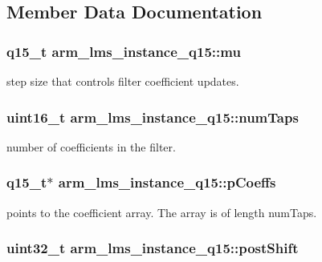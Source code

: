 \subsection{Member Data Documentation}
\hypertarget{structarm__lms__instance__q15_aae46129d7cfd7f1c162cc502ed0a9d49}{
\subsubsection[{mu}]{\setlength{\rightskip}{0pt plus 5cm}q15\-\_\-t arm\-\_\-lms\-\_\-instance\-\_\-q15\-::mu}}\label{structarm__lms__instance__q15_aae46129d7cfd7f1c162cc502ed0a9d49}
step size that controls filter coefficient updates. \hypertarget{structarm__lms__instance__q15_a0078e894f805af1b360369e619fb57b3}{
\subsubsection[{num\-Taps}]{\setlength{\rightskip}{0pt plus 5cm}uint16\-\_\-t arm\-\_\-lms\-\_\-instance\-\_\-q15\-::num\-Taps}}\label{structarm__lms__instance__q15_a0078e894f805af1b360369e619fb57b3}
number of coefficients in the filter. \hypertarget{structarm__lms__instance__q15_a42f95368b94898eb82608e1113d18cab}{
\subsubsection[{p\-Coeffs}]{\setlength{\rightskip}{0pt plus 5cm}q15\-\_\-t$\ast$ arm\-\_\-lms\-\_\-instance\-\_\-q15\-::p\-Coeffs}}\label{structarm__lms__instance__q15_a42f95368b94898eb82608e1113d18cab}
points to the coefficient array. The array is of length num\-Taps. \hypertarget{structarm__lms__instance__q15_acca5fbaef4a52ae411de24c9a0b929cf}{
\subsubsection[{post\-Shift}]{\setlength{\rightskip}{0pt plus 5cm}uint32\-\_\-t arm\-\_\-lms\-\_\-instance\-\_\-q15\-::post\-Shift}}\label{structarm__lms__instance__q15_acca5fbaef4a52ae411de24c9a0b929cf}
